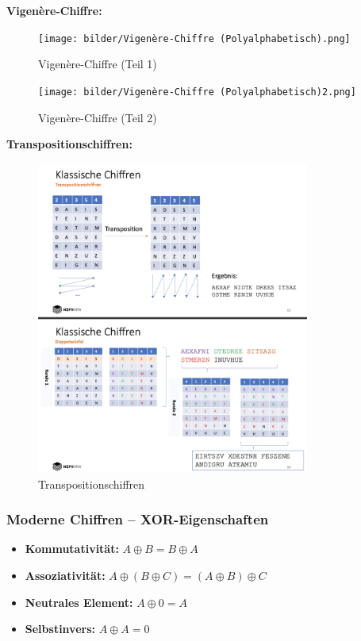\documentclass[a4paper,12pt]{article}
\begin{document}
\vspace{1em}
\noindent\textbf{Vigenère-Chiffre:}
\begin{figure}[H]
    \centering
    \texttt{[image: bilder/Vigenère-Chiffre (Polyalphabetisch).png]}
    \caption{Vigenère-Chiffre (Teil 1)}
    \label{fig:vigenere1}
\end{figure}

\begin{figure}[H]
    \centering
    \texttt{[image: bilder/Vigenère-Chiffre (Polyalphabetisch)2.png]}
    \caption{Vigenère-Chiffre (Teil 2)}
    \label{fig:vigenere2}
\end{figure}

\vspace{1em}
\noindent\textbf{Transpositionschiffren:}
\begin{figure}[H]
    \centering
    \includegraphics[width=0.8\textwidth]{bilder/Transpossitionssschiffrenn.png}
    \caption{Transpositionschiffren}
    \label{fig:transpo}
\end{figure}

\subsubsection{Moderne Chiffren – XOR-Eigenschaften}
\begin{itemize}
    \item \textbf{Kommutativität:} \quad $A \oplus B = B \oplus A$
    \item \textbf{Assoziativität:} \quad $A \oplus (B \oplus C) = (A \oplus B) \oplus C$
    \item \textbf{Neutrales Element:} \quad $A \oplus 0 = A$
    \item \textbf{Selbstinvers:} \quad $A \oplus A = 0$
\end{itemize}
\end{document}
